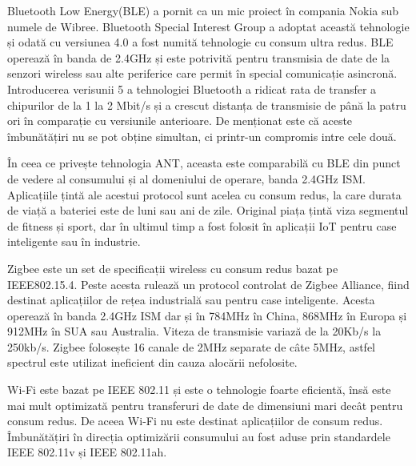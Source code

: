 \documentclass[12pt,a4paper]{report}
\begin{document}
Bluetooth Low Energy(BLE) a pornit ca un mic proiect în compania Nokia sub numele de Wibree. Bluetooth Special Interest Group a adoptat această tehnologie și odată cu versiunea 4.0 a fost numită tehnologie cu consum ultra redus. BLE operează în banda de 2.4GHz și este potrivită pentru transmisia de date de la senzori wireless sau alte periferice care permit în special comunicație asincronă. Introducerea verisunii 5 a tehnologiei Bluetooth a ridicat rata de transfer a chipurilor de la 1 la 2 Mbit/s și a crescut distanța de transmisie de până la patru ori în comparație cu versiunile anterioare. De menționat este că aceste îmbunătățiri nu se pot obține simultan, ci printr-un compromis intre cele două.

În ceea ce privește tehnologia ANT, aceasta este comparabilă cu BLE din punct de vedere al consumului și al domeniului de operare, banda 2.4GHz ISM. Aplicațiile țintă ale acestui protocol sunt acelea cu consum redus, la care durata de viață a bateriei este de luni sau ani de zile. Original piața țintă viza segmentul de fitness și sport, dar în ultimul timp a fost folosit în aplicații IoT pentru case inteligente sau în industrie.

Zigbee este un set de specificații wireless cu consum redus bazat pe IEEE802.15.4. Peste acesta rulează un protocol controlat de Zigbee Alliance, fiind destinat aplicațiilor de rețea industrială sau pentru case inteligente. Acesta operează în banda 2.4GHz ISM dar și în 784MHz în China, 868MHz în Europa și 912MHz în SUA sau Australia. Viteza de transmisie variază de la 20Kb/s la 250kb/s. Zigbee folosește 16 canale de 2MHz separate de câte 5MHz, astfel spectrul este utilizat ineficient din cauza alocării nefolosite.

Wi-Fi este bazat pe IEEE 802.11 și este o tehnologie foarte eficientă, însă este mai mult optimizată pentru transferuri de date de dimensiuni mari decât pentru consum redus. De aceea Wi-Fi nu este destinat aplicațiilor de consum redus. Îmbunătățiri în direcția optimizării consumului au fost aduse prin standardele IEEE 802.11v și IEEE 802.11ah.
\end{document}
